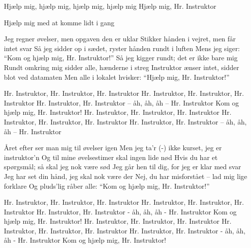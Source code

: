 \documentclass[a4paper,11pt]{article}
\begin{document}
\begin{song}

%
Hjælp mig, hjælp mig, hjælp mig, hjælp mig
Hjælp mig, Hr. Instruktor

Hjælp mig med at komme lidt i gang

%
Jeg regner øvelser, men opgaven den er uklar
Stikker hånden i vejret, men får intet svar
Så jeg sidder op i sædet, ryster hånden rundt i luften
Mens jeg siger: ``Kom og hjælp mig, Hr. Instruktor!''
Så jeg kigger rundt; det er ikke bare mig
Rundt omkring mig sidder alle, hænderne i streg
Instruktor ænser intet, sidder blot ved datamaten
Men alle i lokalet hvisker: ``Hjælp mig, Hr. Instruktor!''


%
Hr. Instruktor, Hr. Instruktor, Hr. Instruktor
Hr. Instruktor, Hr. Instruktor, Hr. Instruktor
Hr. Instruktor, Hr. Instruktor -- åh, åh, åh -- Hr. Instruktor
 Kom og hjælp mig, Hr. Instruktor!
%
Hr. Instruktor, Hr. Instruktor, Hr. Instruktor
Hr. Instruktor, Hr. Instruktor, Hr. Instruktor
Hr. Instruktor, Hr. Instruktor -- åh, åh, åh -- Hr. Instruktor


%
Året efter ser man mig til øvelser igen
Men jeg ta'r (-) ikke kurset, jeg er instruktor'n
Og til mine øvelsestimer skal ingen lide nød
Hvis du har et spørgsmål; så skal jeg nok være sød
%
Jeg går hen til dig, for jeg er klar med svar
%
Jeg har set din hånd, jeg skal nok være der
%
Nej, du har misforstået -- lad mig lige forklare
%
Og pluds'lig råber alle: ``Kom og hjælp mig, Hr. Instruktor!''

%
Hr. Instruktor, Hr. Instruktor, Hr. Instruktor
Hr. Instruktor, Hr. Instruktor, Hr. Instruktor
Hr. Instruktor, Hr. Instruktor - åh, åh, åh - Hr. Instruktor
 Kom og hjælp mig, Hr. Instruktor!
%
Hr. Instruktor, Hr. Instruktor, Hr. Instruktor
Hr. Instruktor, Hr. Instruktor, Hr. Instruktor
Hr. Instruktor, Hr. Instruktor - åh, åh, åh - Hr. Instruktor
 Kom og hjælp mig, Hr. Instruktor!


\end{song}
\end{document}
